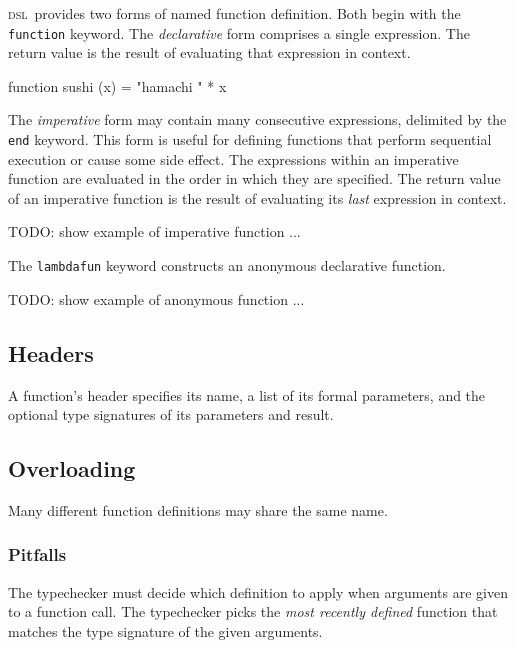 \documentclass[11pt]{article}
\newcommand{\DSL}{{\scshape dsl}}
\newcommand{\literal}[1]{\lstinline[style=DSL,identifierstyle=\itshape]!#1!}
\newcommand{\keyword}[1]{\literal{#1}}
\begin{document}
\DSL\ provides two forms of named function definition. 
Both begin with the \keyword{function} keyword.
The {\it declarative} form comprises a single expression.
The return value is the result of evaluating that expression in context.

\begin{dsl}
function sushi (x) = "hamachi " * x
\end{dsl}

The {\it imperative} form may contain many consecutive expressions, delimited by the \keyword{end} keyword.
This form is useful for defining functions that perform sequential execution or cause some side effect.
The expressions within an imperative function are evaluated in the order in which they are specified.
The return value of an imperative function is the result of evaluating its {\it last} expression in context.

\begin{dsl}
TODO: show example of imperative function
...
\end{dsl}

The \keyword{lambdafun} keyword constructs an anonymous declarative function.

\begin{dsl}
TODO: show example of anonymous function
...
\end{dsl}

\subsection{Headers}

A function's header specifies its name, a list of its formal parameters, and the optional type signatures of its parameters and result.

\subsection{Overloading}

Many different function definitions may share the same name.

\subsubsection{Pitfalls}

The typechecker must decide which definition to apply when arguments are given to a function call.
The typechecker picks the \emph{most recently defined} function that matches the type signature of the given arguments.
\end{document}
